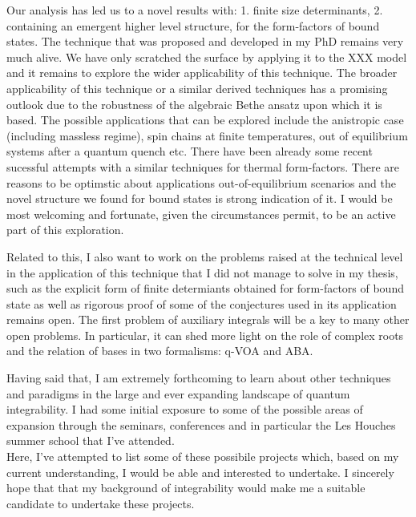 \documentclass[a4paper, 11pt, DIV=15]{scrarticle}
\begin{document}
Our analysis has led us to a novel results with: 1. finite size determinants, 2. containing an emergent higher level structure, for the form-factors of bound states.
The technique that was proposed and developed in my PhD remains very much alive. We have only scratched the surface by applying it to the XXX model and it remains to explore the wider applicability of this technique.
The broader applicability of this technique or a similar derived techniques has a promising outlook due to the robustness of the algebraic Bethe ansatz upon which it is based.
The possible applications that can be explored include the anistropic case (including massless regime), spin chains at finite temperatures, out of equilibrium systems after a quantum quench etc.
There have been already some recent sucessful attempts with a similar techniques for thermal form-factors.
There are reasons to be optimstic about applications out-of-equilibrium scenarios and the novel structure we found for bound states is strong indication of it.
I would be most welcoming and fortunate, given the circumstances permit, to be an active part of this exploration.
\par
Related to this, I also want to work on the problems raised at the technical level in the application of this technique that I did not manage to solve in my thesis, such as the explicit form of finite determiants obtained for form-factors of bound state as well as rigorous proof of some of the conjectures used in its application remains open.
The first problem of auxiliary integrals will be a key to many other open problems. In particular, it can shed more light on the role of complex roots and the relation of bases in two formalisms: q-VOA and ABA.
\par
\vspace{.5em}
Having said that, I am extremely forthcoming to learn about other techniques and paradigms in the large and ever expanding landscape of quantum integrability.
I had some initial exposure to some of the possible areas of expansion through the seminars, conferences and in particular the Les Houches summer school that I've attended. 
\\
Here, I've attempted to list some of these possibile projects which, based on my current understanding, I would be able and interested to undertake.
I sincerely hope that that my background of integrability would make me a suitable candidate to undertake these projects.
\end{document}
